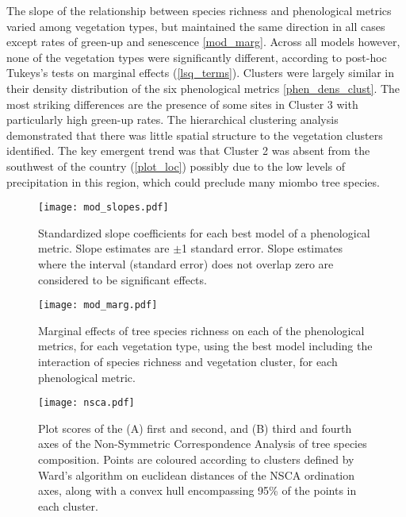 \documentclass[11pt,a4paper]{article}
\begin{document}
The slope of the relationship between species richness and phenological metrics
varied among vegetation types, but maintained the same direction in all cases
except rates of green-up and senescence \autoref{mod_marg}. Across all models
however, none of the vegetation types were significantly different, according to
post-hoc Tukeys's tests on marginal effects (\autoref{lsq_terms}). Clusters were
largely similar in their density distribution of the six phenological metrics
\autoref{phen_dens_clust}. The most striking differences are the presence of
some sites in Cluster 3 with particularly high green-up rates. The hierarchical
clustering analysis demonstrated that there was little spatial structure to the
vegetation clusters identified. The key emergent trend was that Cluster 2 was
absent from the southwest of the country (\autoref{plot_loc}) possibly due to
the low levels of precipitation in this region, which could preclude many miombo
tree species.



 

\begin{figure}[H]
\centering
	\texttt{[image: mod\_slopes.pdf]}
	\caption{Standardized slope coefficients for each best model of a phenological metric. Slope estimates are $\pm$1 standard error. Slope estimates where the interval (standard error) does not overlap zero are considered to be significant effects.}
	\label{mod_slopes}
\end{figure}

\begin{figure}[H]
\centering
	\texttt{[image: mod\_marg.pdf]}
	\caption{Marginal effects of tree species richness on each of the
	phenological metrics, for each vegetation type, using the best model
including the interaction of species richness and vegetation cluster, for each
phenological metric.}
	\label{mod_marg}
\end{figure}

\begin{figure}[H]
\centering
	\texttt{[image: nsca.pdf]}
	\caption{Plot scores of the (A) first and second, and (B) third and fourth
	axes of the Non-Symmetric Correspondence Analysis of tree species
composition. Points are coloured according to clusters defined by Ward's
algorithm on euclidean distances of the NSCA ordination axes, along with a
convex hull encompassing 95\% of the points in each cluster.}
	\label{nsca}
\end{figure}
\end{document}

